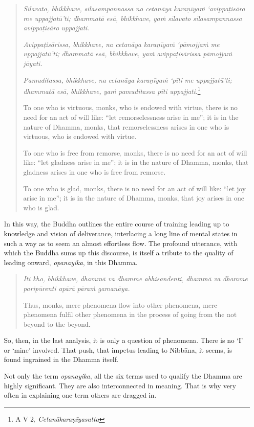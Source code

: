 \begin{quote}
\emph{Sīlavato, bhikkhave, sīlasampannassa na cetanāya karaṇīyaṁ `avippaṭisāro me uppajjatū'ti; dhammatā esā, bhikkhave, yaṁ sīlavato sīlasampannassa avippaṭisāro uppajjati.}

\emph{Avippaṭisārissa, bhikkhave, na cetanāya karaṇīyaṁ `pāmojjaṁ me uppajjatū'ti; dhammatā esā, bhikkhave, yaṁ avippaṭisārissa pāmojjaṁ jāyati.}

\emph{Pamuditassa, bhikkhave, na cetanāya karaṇīyaṁ `pīti me uppajjatū'ti; dhammatā esā, bhikkhave, yaṁ pamuditassa pīti uppajjati.}\footnote{A V 2, \emph{Cetanākaraṇīyasutta}}

To one who is virtuous, monks, who is endowed with virtue, there is no need for an act of will like: ``let remorselessness arise in me''; it is in the nature of Dhamma, monks, that remorselessness arises in one who is virtuous, who is endowed with virtue.

To one who is free from remorse, monks, there is no need for an act of will like: ``let gladness arise in me''; it is in the nature of Dhamma, monks, that gladness arises in one who is free from remorse.

To one who is glad, monks, there is no need for an act of will like: ``let joy arise in me''; it is in the nature of Dhamma, monks, that joy arises in one who is glad.
\end{quote}

In this way, the Buddha outlines the entire course of training leading up to knowledge and vision of deliverance, interlacing a long line of mental states in such a way as to seem an almost effortless flow. The profound utterance, with which the Buddha sums up this discourse, is itself a tribute to the quality of leading onward, \emph{opanayika}, in this Dhamma.

\begin{quote}
\emph{Iti kho, bhikkhave, dhammā va dhamme abhisandenti, dhammā va dhamme paripūrenti apārā pāraṁ gamanāya.}

Thus, monks, mere phenomena flow into other phenomena, mere phenomena fulfil other phenomena in the process of going from the not beyond to the beyond.
\end{quote}

So, then, in the last analysis, it is only a question of phenomena. There is no `I' or `mine' involved. That push, that impetus leading to Nibbāna, it seems, is found ingrained in the Dhamma itself.

Not only the term \emph{opanayika}, all the six terms used to qualify the Dhamma are highly significant. They are also interconnected in meaning. That is why very often in explaining one term others are dragged in.

